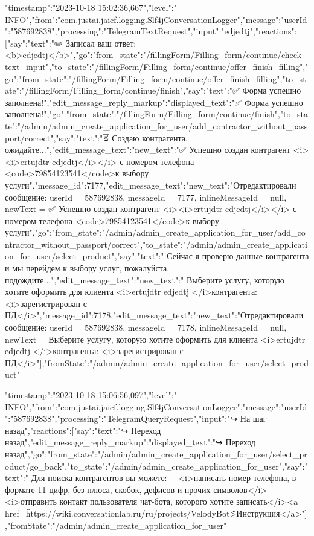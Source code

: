 \documentclass{article}
\begin{document}
\item{
{"timestamp":"2023-10-18 15:02:36,667","level":" INFO","from":"com.justai.jaicf.logging.Slf4jConversationLogger","message":{"userId":"587692838","processing":"TelegramTextRequest","input":"edjedtj","reactions":[{"say":{"text":"✏️ Записал ваш ответ: <b>edjedtj</b>"}},{"go":{"from_state":"/fillingForm/Filling_form/continue/check_text_input","to_state":"/fillingForm/Filling_form/continue/offer_finish_filling"}},{"go":{"from_state":"/fillingForm/Filling_form/continue/offer_finish_filling","to_state":"/fillingForm/Filling_form/continue/finish"}},{"say":{"text":"✅ Форма успешно заполнена!"}},{"edit_message_reply_markup":{"displayed_text":"✅ Форма успешно заполнена!"}},{"go":{"from_state":"/fillingForm/Filling_form/continue/finish","to_state":"/admin/admin_create_application_for_user/add_contractor_without_passport/correct"}},{"say":{"text":"⏳ Создаю контрагента, ожидайте..."}},{"edit_message_text":{"new_text":"✅ Успешно создан контрагент <i><i>ertujdtr edjedtj</i></i> с номером телефона <code>79854123541</code>\n{} к выбору услуги","message_id":7177}},{"edit_message_text":{"new_text":"Отредактировали сообщение: userId = 587692838, messageId = 7177, inlineMessageId = null, newText = ✅ Успешно создан контрагент <i><i>ertujdtr edjedtj</i></i> с номером телефона <code>79854123541</code>\n{} к выбору услуги"}},{"go":{"from_state":"/admin/admin_create_application_for_user/add_contractor_without_passport/correct","to_state":"/admin/admin_create_application_for_user/select_product"}},{"say":{"text":" Сейчас я проверю данные контрагента и мы перейдем к выбору услуг, пожалуйста, подождите..."}},{"edit_message_text":{"new_text":" Выберите услугу, которую хотите оформить для клиента <i>ertujdtr edjedtj </i>\n{} контрагента: <i>зарегистрирован с ПД</i>","message_id":7178}},{"edit_message_text":{"new_text":"Отредактировали сообщение: userId = 587692838, messageId = 7178, inlineMessageId = null, newText =  Выберите услугу, которую хотите оформить для клиента <i>ertujdtr edjedtj </i>\n{} контрагента: <i>зарегистрирован с ПД</i>"}}],"fromState":"/admin/admin_create_application_for_user/select_product"}}
}

\item{
{"timestamp":"2023-10-18 15:06:56,097","level":" INFO","from":"com.justai.jaicf.logging.Slf4jConversationLogger","message":{"userId":"587692838","processing":"TelegramQueryRequest","input":"↪️ На шаг назад","reactions":[{"say":{"text":"↪️ Переход назад"}},{"edit_message_reply_markup":{"displayed_text":"↪️ Переход назад"}},{"go":{"from_state":"/admin/admin_create_application_for_user/select_product/go_back","to_state":"/admin/admin_create_application_for_user"}},{"say":{"text":" Для поиска контрагентов вы можете:\n\n— <i>написать номер телефона, в формате 11 цифр, без плюса, скобок, дефисов и прочих символов</i>\n— <i>отправить контакт пользователя чат-бота, которого хотите записать</i>\n\n <a href=\"https://wiki.conversationlab.ru/ru/projects/VelodyBot\">Инструкция</a>"}}],"fromState":"/admin/admin_create_application_for_user"}}
}
\end{document}
